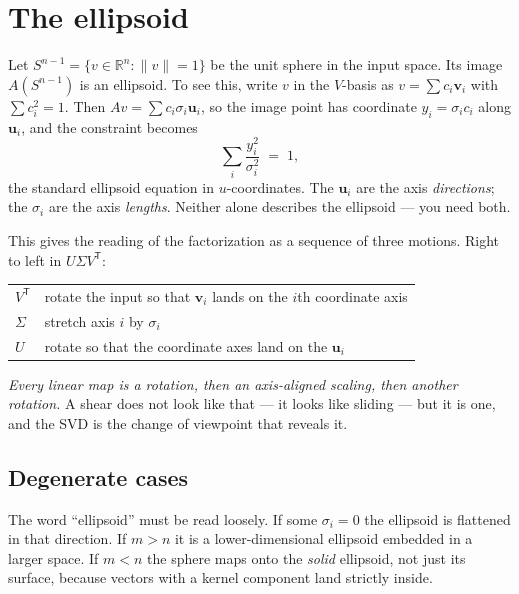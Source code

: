 \documentclass[11pt]{article}
\numberwithin{equation}{section}
\newcommand{\R}{\mathbb{R}}
\newcommand{\T}{^{\mathsf{T}}}
\newcommand{\vv}[1]{\mathbf{v}_{#1}}
\newcommand{\uu}[1]{\mathbf{u}_{#1}}
\theoremstyle{plainish}
\begin{document}
\section{The ellipsoid}
\label{sec:ellipsoid}

Let $S^{n-1} = \{v \in \R^n : \|v\| = 1\}$ be the unit sphere in the input
space. Its image $A(S^{n-1})$ is an ellipsoid. To see this, write $v$ in the
$V$-basis as $v = \sum c_i \vv i$ with $\sum c_i^2 = 1$. Then
$Av = \sum c_i \sigma_i \uu i$, so the image point has coordinate
$y_i = \sigma_i c_i$ along $\uu i$, and the constraint becomes
\begin{equation}\sum_i \frac{y_i^2}{\sigma_i^2} \;=\; 1 ,
\end{equation}
the standard ellipsoid equation in $u$-coordinates. The $\uu i$ are the axis
\emph{directions}; the $\sigma_i$ are the axis \emph{lengths}. Neither alone
describes the ellipsoid --- you need both.

This gives the reading of the factorization as a sequence of three motions.
Right to left in $U\Sigma V\T$:

\begin{center}
\begin{tabular}{@{}ll@{}}
\toprule
$V\T$ & rotate the input so that $\vv i$ lands on the $i$th coordinate axis \\
$\Sigma$ & stretch axis $i$ by $\sigma_i$ \\
$U$ & rotate so that the coordinate axes land on the $\uu i$ \\
\bottomrule
\end{tabular}
\end{center}

\noindent
\emph{Every linear map is a rotation, then an axis-aligned scaling, then
another rotation.} A shear does not look like that --- it looks like sliding
--- but it is one, and the SVD is the change of viewpoint that reveals it.

\subsection*{Degenerate cases}

The word ``ellipsoid'' must be read loosely. If some $\sigma_i = 0$ the
ellipsoid is flattened in that direction. If $m > n$ it is a lower-dimensional
ellipsoid embedded in a larger space. If $m < n$ the sphere maps onto the
\emph{solid} ellipsoid, not just its surface, because vectors with a kernel
component land strictly inside.
\end{document}
